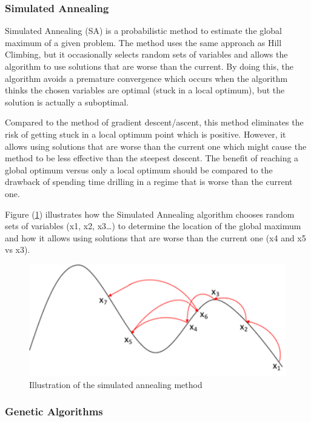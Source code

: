 \subsubsection{Simulated Annealing}

Simulated Annealing (SA) is a probabilistic method to estimate the global maximum of a given problem. The method uses the same approach as Hill Climbing, but it occasionally selects random sets of variables and allows the algorithm to use solutions that are worse than the current. By doing this, the algorithm avoids a premature convergence which occurs when the algorithm thinks the chosen variables are optimal (stuck in a local optimum), but the solution is actually a suboptimal. 

Compared to the method of gradient descent/ascent, this method eliminates the risk of getting stuck in a local optimum point which is positive. However, it allows using solutions that are worse than the current one which might cause the method to be less effective than the steepest descent. The benefit of reaching a global optimum versus only a local optimum should be compared to the drawback of spending time drilling in a regime that is worse than the current one.

Figure (\ref{fig:siman}) illustrates how the Simulated Annealing algorithm chooses random sets of variables (x1, x2, x3…) to determine the location of the global maximum and how it allows using solutions that are worse than the current one (x4 and x5 vs x3).

\begin{figure} [H]
\centering
\includegraphics[width=1.0\textwidth]{figures/siman.png}
\caption{Illustration of the simulated annealing method}
\label{fig:siman}
\end{figure}

\subsubsection{Genetic Algorithms}

